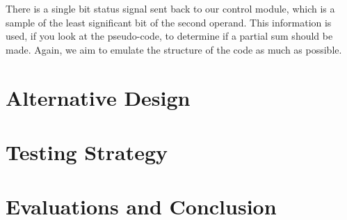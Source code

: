 \documentclass[11pt,twocolumn]{article}
\begin{document}
There is a single bit status signal sent back to our control module, which is a sample of the least significant bit of the second operand.
This information is used, if you look at the pseudo-code, to determine if a partial sum should be made. Again, we aim to emulate the structure of the code as much as possible.   
 

\section{Alternative Design}

\section{Testing Strategy}

\section{Evaluations and Conclusion}
\end{document}
